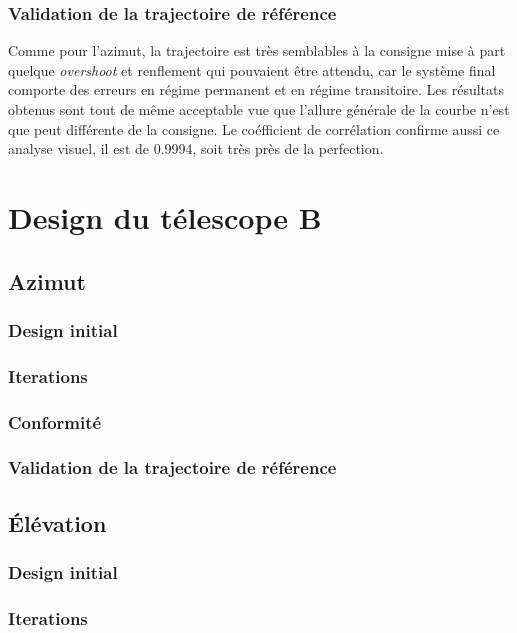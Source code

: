 \documentclass{udes_rapport} %
\begin{document}
\subsubsection{Validation de la trajectoire de référence}
Comme pour l'azimut, la trajectoire est très semblables à la consigne mise à part quelque \textit{overshoot} et renflement qui pouvaient être attendu, car  le système final comporte des erreurs en régime permanent et en régime transitoire. Les résultats obtenus sont tout de même acceptable vue que l'allure générale de la courbe n'est que peut différente de la consigne. Le coéfficient de corrélation confirme aussi ce analyse visuel, il est de 0.9994, soit très près de la perfection.
\section{Design du télescope B}
\subsection{Azimut}
\subsubsection{Design initial}
\subsubsection{Iterations}

\subsubsection{Conformité}
\subsubsection{Validation de la trajectoire de référence}
\subsection{Élévation}
\subsubsection{Design initial}
\subsubsection{Iterations}
\end{document}
